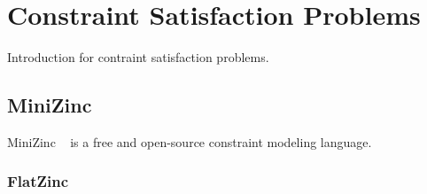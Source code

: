 \chapter{Constraint Satisfaction Problems}

Introduction for contraint satisfaction problems.

\section{MiniZinc}

MiniZinc ~\cite{minizinc:2007} is a free and open-source constraint modeling language.

\subsection{FlatZinc}


